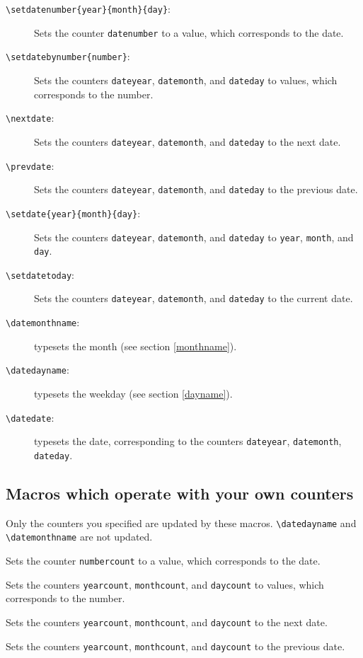 \begin{description}
\item[\texttt{\textbackslash setdatenumber\{year\}\{month\}\{day\}}:] Sets the counter \texttt{datenumber} to a value, which corresponds to the date.
\item[\texttt{\textbackslash setdatebynumber\{number\}}:] Sets the counters \texttt{dateyear}, \texttt{datemonth}, and \texttt{dateday} to values, which corresponds to the number.
\item[\texttt{\textbackslash nextdate}:] Sets the counters \texttt{dateyear}, \texttt{datemonth}, and \texttt{dateday} to the next date.
\item[\texttt{\textbackslash prevdate}:] Sets the counters \texttt{dateyear}, \texttt{datemonth}, and \texttt{dateday} to the previous date.
\item[\texttt{\textbackslash setdate\{year\}\{month\}\{day\}}:] Sets the counters \texttt{dateyear}, \texttt{datemonth}, and \texttt{dateday} to \texttt{year}, \texttt{month}, and \texttt{day}.
\item[\texttt{\textbackslash setdatetoday}:] Sets the counters \texttt{dateyear}, \texttt{datemonth}, and \texttt{dateday} to the current date.
\item[\texttt{\textbackslash datemonthname}:] typesets the month (see section \ref{monthname}).
\item[\texttt{\textbackslash datedayname}:] typesets the weekday (see section \ref{dayname}).
\item[\texttt{\textbackslash datedate}:] typesets the date, corresponding to the counters \texttt{dateyear}, \texttt{datemonth}, \texttt{dateday}.
\end{description}


\subsection{Macros which operate with your own counters}
Only the counters you specified are updated by these macros. \verb+\datedayname+ and \verb+\datemonthname+ are not updated.
\begin{description}\sloppypar
\item[\texttt{\textbackslash setmydatenumber\{numbercount\}\{year\}\{month\}\{day\}}:] Sets the counter \texttt{numbercount} to a value, which corresponds to the date.
\item[\texttt{\textbackslash setmydatebynumber\{number\}\{yearcount\}\{monthcount\}\{daycount\}}:] Sets the counters \texttt{yearcount}, \texttt{monthcount}, and \texttt{daycount} to values, which corresponds to the number.
\item[\texttt{\textbackslash mynextdate\{yearcount\}\{monthcount\}\{daycount\}}:] Sets the counters \texttt{yearcount}, \texttt{monthcount}, and \texttt{daycount} to the next date.
\item[\texttt{\textbackslash mynextdate\{yearcount\}\{monthcount\}\{daycount\}}:]Sets the counters \texttt{yearcount}, \texttt{monthcount}, and \texttt{daycount} to the previous date.
\end{description}



